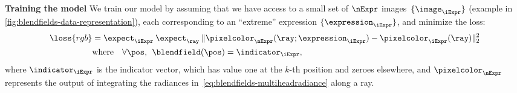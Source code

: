     
    \noindent\textbf{Training the model}
    We train our model by assuming that we have access to a small set of $\nExpr$ images~$\{\image_\iExpr\}$ (example in \cref{fig:blendfields-data-representation}), each corresponding to an ``extreme'' expression $\{\expression_\iExpr\}$, and minimize the loss:
    \begin{align}
      \label{eq:blendfields-loss}
      \loss{rgb} & =
      \expect_{\iExpr} \:
      \expect_{\ray} \:
      \| \pixelcolor_\nExpr(\ray; \expression_\iExpr) - \pixelcolor_\iExpr(\ray) \|_2^2
      \\
                 & \text{where} \quad \forall \pos,\:\: \blendfield(\pos) = \indicator_\iExpr,
    \end{align}
    where $\indicator_\iExpr$ is the indicator vector, which has value one at the $k$-th position and zeroes elsewhere, and $\pixelcolor_\nExpr$ represents the output of integrating the radiances in~\cref{eq:blendfields-multiheadradiance} along a ray.

